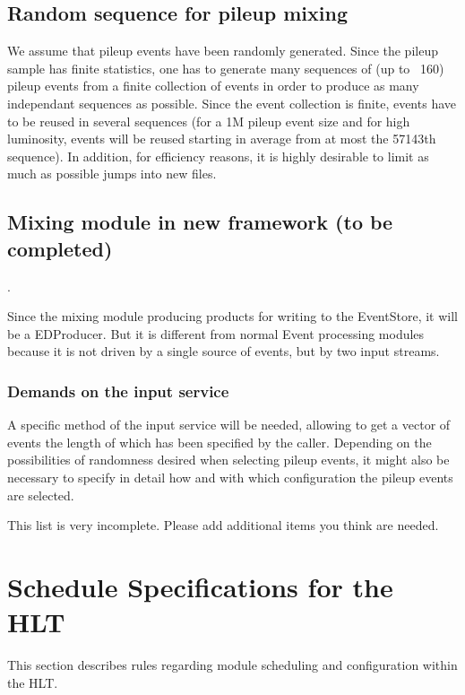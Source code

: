 \documentclass[draftmode]{memarticle}
\begin{document}
\subsection {Random sequence for pileup mixing}

We assume that pileup events have been randomly generated. Since the pileup 
sample has finite statistics, one has to generate many sequences of 
(up to ~160) pileup events from a finite collection of events in order to 
produce as many independant sequences as possible. Since the event collection 
is finite, events have to be reused in several sequences (for a 1M pileup 
event size and for high luminosity, events will be reused starting in 
average from at most the 57143th sequence). In addition, for efficiency 
reasons, it is highly desirable to limit as much as possible jumps into new files.

\subsection {Mixing module in new framework ({to be completed})}.

Since the mixing module producing products for writing to the EventStore, it will
be a EDProducer.  But it is different from normal Event processing modules because it is 
not driven by a single source of events, but by two input streams.

\subsubsection {Demands on the input service}
A specific method of the input service will be needed, allowing to get a vector of events 
the length of which has been specified by the caller. Depending on the possibilities of 
randomness desired when selecting pileup events, it might also be necessary to specify 
in detail how and with which configuration the pileup events are selected.

\begin{fixme}
This list is very incomplete.
Please add additional items you think are needed.
\end{fixme}

\section{Schedule Specifications for the HLT}

This section describes rules regarding module scheduling and
configuration within the HLT.
\end{document}
